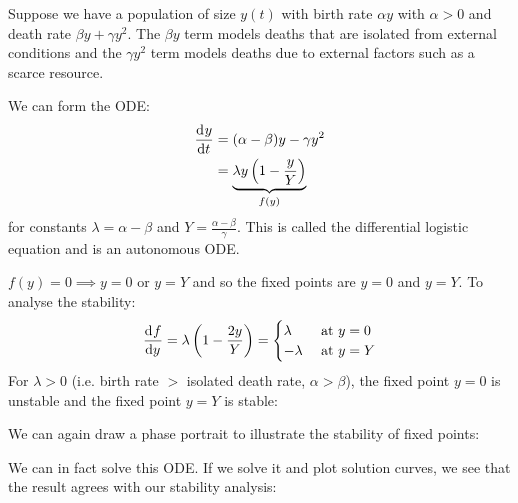 \documentclass[../main.tex]{subfiles}
\begin{document}
\begin{example}
  \label{populationExample}
  Suppose we have a population of size $y(t)$ with birth rate $\alpha y$ with $\alpha > 0$ and death rate $\beta y + \gamma y^2$.
  The $\beta y$ term models deaths that are isolated from external conditions and the $\gamma y^2$ term models deaths due to external factors such as a scarce resource.

  We can form the ODE:
  \begin{align*}
    \deriv{y}{t} &= (\alpha - \beta)y - \gamma y^2 \\
                 &= \underbrace{\lambda y\left(1 - \frac{y}{Y}\right)}_{f(y)}
  \end{align*}
  for constants $\lambda = \alpha - \beta$ and $Y = \frac{\alpha - \beta}{\gamma}$.
  This is called the differential logistic equation and is an autonomous ODE.

  $f(y) = 0 \implies y = 0 \text{ or } y = Y$ and so the fixed points are $y = 0$ and $y = Y$.
  To analyse the stability:
  \[
    \deriv{f}{y} = \lambda\left(1-\frac{2y}{Y}\right) = \begin{cases}
    \lambda & \text{ at }y=0 \\
    -\lambda & \text{ at } y=Y
    \end{cases}
  \]
  For $\lambda > 0$ (i.e. birth rate $>$ isolated death rate, $\alpha > \beta$), the fixed point $y = 0$ is unstable and the fixed point $y = Y$ is stable:
  \begin{center}
  \end{center}
  We can again draw a phase portrait to illustrate the stability of fixed points:
  \begin{center}
  \end{center}
  We can in fact solve this ODE.
  If we solve it and plot solution curves, we see that the result agrees with our stability analysis:
  \begin{center}
\end{center}
\end{example}
\end{document}
